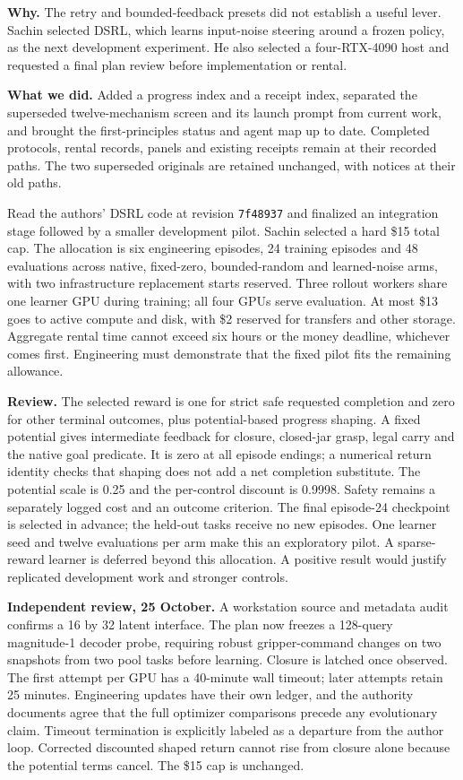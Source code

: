 \documentclass[11pt,a4paper]{article}
\begin{document}
\textbf{Why.} The retry and bounded-feedback presets did not establish a useful lever. Sachin selected DSRL, which learns input-noise steering around a frozen policy, as the next development experiment. He also selected a four-RTX-4090 host and requested a final plan review before implementation or rental.

\textbf{What we did.} Added a progress index and a receipt index, separated the superseded twelve-mechanism screen and its launch prompt from current work, and brought the first-principles status and agent map up to date. Completed protocols, rental records, panels and existing receipts remain at their recorded paths. The two superseded originals are retained unchanged, with notices at their old paths.

Read the authors' DSRL code at revision \texttt{7f48937} and finalized an integration stage followed by a smaller development pilot. Sachin selected a hard \$15 total cap. The allocation is six engineering episodes, 24 training episodes and 48 evaluations across native, fixed-zero, bounded-random and learned-noise arms, with two infrastructure replacement starts reserved. Three rollout workers share one learner GPU during training; all four GPUs serve evaluation. At most \$13 goes to active compute and disk, with \$2 reserved for transfers and other storage. Aggregate rental time cannot exceed six hours or the money deadline, whichever comes first. Engineering must demonstrate that the fixed pilot fits the remaining allowance.

\textbf{Review.} The selected reward is one for strict safe requested completion and zero for other terminal outcomes, plus potential-based progress shaping. A fixed potential gives intermediate feedback for closure, closed-jar grasp, legal carry and the native goal predicate. It is zero at all episode endings; a numerical return identity checks that shaping does not add a net completion substitute. The potential scale is 0.25 and the per-control discount is 0.9998. Safety remains a separately logged cost and an outcome criterion. The final episode-24 checkpoint is selected in advance; the held-out tasks receive no new episodes. One learner seed and twelve evaluations per arm make this an exploratory pilot. A sparse-reward learner is deferred beyond this allocation. A positive result would justify replicated development work and stronger controls.

\textbf{Independent review, 25 October.} A workstation source and metadata audit confirms a 16 by 32 latent interface. The plan now freezes a 128-query magnitude-1 decoder probe, requiring robust gripper-command changes on two snapshots from two pool tasks before learning. Closure is latched once observed. The first attempt per GPU has a 40-minute wall timeout; later attempts retain 25 minutes. Engineering updates have their own ledger, and the authority documents agree that the full optimizer comparisons precede any evolutionary claim. Timeout termination is explicitly labeled as a departure from the author loop. Corrected discounted shaped return cannot rise from closure alone because the potential terms cancel. The \$15 cap is unchanged.
\end{document}
